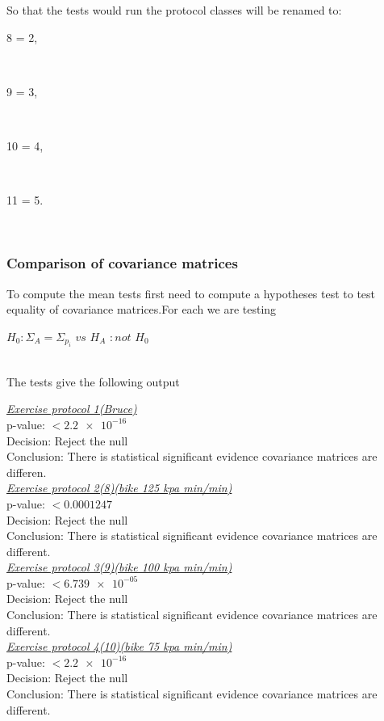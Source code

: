\documentclass[a4paper]{article}
\begin{document}
So that the tests would run the protocol classes will be renamed to:\\
\centerline{8 = 2,}\\
\centerline{9 = 3,}\\
\centerline{10 = 4,}\\
\centerline{11 = 5.}\\

\newpage
\subsubsection{Comparison of covariance matrices}
To compute the mean tests first need to compute a hypotheses test to test equality of covariance matrices.For each we are testing\\ 
\centerline{ $H_0 : \Sigma_A = \Sigma_{p_i}$ $vs$ $H_A $ $: not$  $H_0$}\\
The tests give the following output



\underline{\textit{Exercise protocol 1(Bruce)}}\\
p-value: $< \num{2.2e-16}$\\
Decision: Reject the null\\
Conclusion: There is statistical significant evidence covariance matrices 
are differen.\\


\underline{\textit{Exercise protocol 2(8)(bike 125 kpa min/min)}}\\
p-value: $< \num{0.0001247}$\\
Decision: Reject the null\\
Conclusion: There is statistical significant evidence covariance matrices 
are different.\\


\underline{\textit{Exercise protocol 3(9)(bike 100 kpa min/min)}}\\
p-value: $< \num{6.739e-05}$\\
Decision: Reject the null\\
Conclusion: There is statistical significant evidence covariance matrices 
are different.\\


\underline{\textit{Exercise protocol 4(10)(bike 75 kpa min/min)}}\\
p-value: $< \num{2.2e-16}$\\
Decision: Reject the null\\
Conclusion: There is statistical significant evidence covariance matrices 
are different.\\
\end{document}
